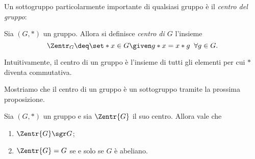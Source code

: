 Un sottogruppo particolarmente importante di qualsiasi gruppo è il \emph{centro del gruppo}:

\begin{definition}
     \label{def:centro}
    Sia $(G, *)$ un gruppo. Allora si definisce \emph{centro di $G$} l'insieme \[
        \Zentr_{G} \deq \set*{x \in G \given g*x = x*g \;\;\forall g \in G}.    
    \]
\end{definition}

Intuitivamente, il centro di un gruppo è l'insieme di tutti gli elementi per cui $*$ diventa commutativa.

Mostriamo che il centro di un gruppo è un sottogruppo tramite la prossima proposizione.

\begin{proposition}
    \label{prop:centro}
    Sia $(G, *)$ un gruppo e sia $\Zentr{G}$ il suo centro.
    Allora vale che \begin{enumerate}[label={(\roman*)}, ref={\theproposition: (\roman*)}]
        \item $\Zentr{G} \sgr G$;
        \item $\Zentr{G} = G$ se e solo se $G$ è abeliano.
    \end{enumerate}
\end{proposition}
